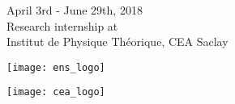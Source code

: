 \begin{titlepage}


{\large April 3rd - June 29th, 2018 \\Research internship at \\ Institut de Physique Th{\'e}orique}, CEA Saclay\\[1cm] %


\begin{minipage}{0.4\textwidth}
\begin{flushleft} \large
\centering
\texttt{[image: ens\_logo]}\\[1cm] %
  
\end{flushleft}
\begin{flushright} \large
\centering
\texttt{[image: cea\_logo]}\\[1cm] %
  
\end{flushright}
\end{minipage}\\[1cm]

\vfill %

\end{titlepage}

\iffalse
